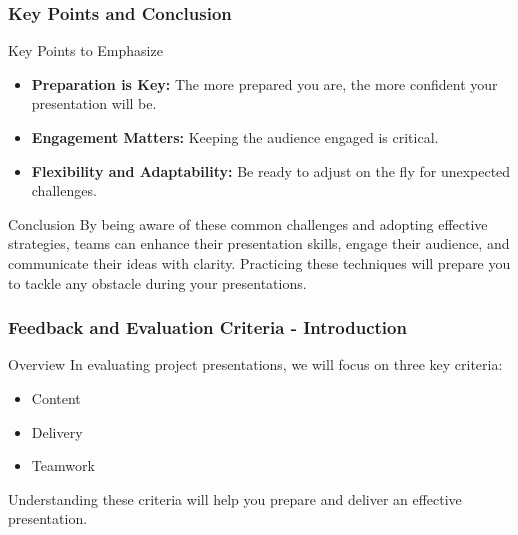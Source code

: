 \documentclass[aspectratio=169]{beamer}
\begin{document}
\begin{frame}[fragile]
    \frametitle{Key Points and Conclusion}
    
    \begin{block}{Key Points to Emphasize}
        \begin{itemize}
            \item \textbf{Preparation is Key:} The more prepared you are, the more confident your presentation will be.
            \item \textbf{Engagement Matters:} Keeping the audience engaged is critical.
            \item \textbf{Flexibility and Adaptability:} Be ready to adjust on the fly for unexpected challenges.
        \end{itemize}
    \end{block}

    \begin{block}{Conclusion}
        By being aware of these common challenges and adopting effective strategies, teams can enhance their presentation skills, engage their audience, and communicate their ideas with clarity.
        Practicing these techniques will prepare you to tackle any obstacle during your presentations.
    \end{block}
\end{frame}

\begin{frame}[fragile]
    \frametitle{Feedback and Evaluation Criteria - Introduction}
    \begin{block}{Overview}
        In evaluating project presentations, we will focus on three key criteria:
        \begin{itemize}
            \item Content
            \item Delivery
            \item Teamwork
        \end{itemize}
        Understanding these criteria will help you prepare and deliver an effective presentation.
    \end{block}
\end{frame}
\end{document}
